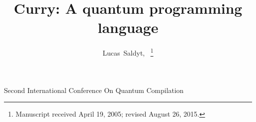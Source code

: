 \documentclass[journal]{IEEEtran}
\begin{document}
%
\title{Curry: A quantum programming language}
%
%
%

\author{Lucas~Saldyt,~
\thanks{Manuscript received April 19, 2005; revised August 26, 2015.}}

% 
%

%
{Second International Conference On Quantum Compilation}
% 
\end{document}
